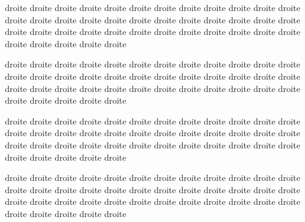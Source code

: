 \documentclass[12pt]{book}
\begin{document}
\begin{pages}
\begin{Rightside}
\pstart
\begin{ledgroup}
droite droite droite droite droite droite droite droite droite droite droite droite droite droite droite droite droite droite droite droite droite droite droite droite droite droite droite droite droite droite droite droite droite droite droite droite droite droite droite droite droite 
\end{ledgroup}
\pend

\pstart
\begin{ledgroup}
droite droite droite droite droite droite droite droite droite droite droite droite droite droite droite droite droite droite droite droite droite droite droite droite droite droite droite droite droite droite droite droite droite droite droite droite droite droite droite droite droite 
\end{ledgroup}
\pend

\pstart
\begin{ledgroup}
droite droite droite droite droite droite droite droite droite droite droite droite droite droite droite droite droite droite droite droite droite droite droite droite droite droite droite droite droite droite droite droite droite droite droite droite droite droite droite droite droite 
\end{ledgroup}
\pend

\pstart
\begin{ledgroup}
droite droite droite droite droite droite droite droite droite droite droite droite droite droite droite droite droite droite droite droite droite droite droite droite droite droite droite droite droite droite droite droite droite droite droite droite droite droite droite droite droite 
\end{ledgroup}
\pend
\endnumbering
\end{Rightside}

\end{pages}
\Pages
\end{document}
